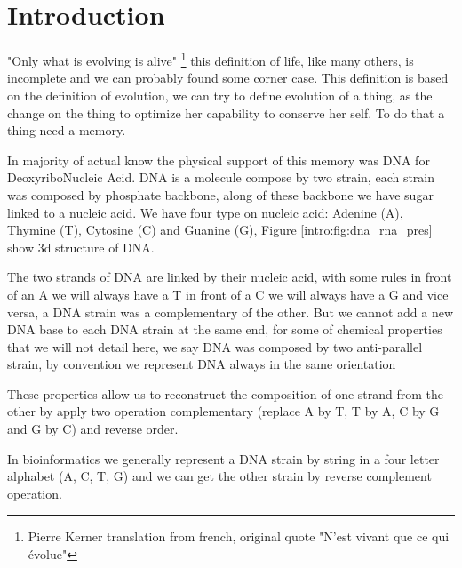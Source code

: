 \documentclass[./main.tex]{subfiles}
\begin{document}
\chapter{Introduction}\label{chapter:introduction}

"Only what is evolving is alive" \footnote{Pierre Kerner translation from french, original quote "N'est vivant que ce qui évolue"} this definition of life, like many others, is incomplete and we can probably found some corner case. This definition is based on the definition of evolution, we can try to define evolution of a thing, as the change on the thing to optimize her capability to conserve her self. To do that a thing need a memory.

In majority of actual know the physical support of this memory was DNA for DeoxyriboNucleic Acid. DNA is a molecule compose by two strain, each strain was composed by phosphate backbone, along of these backbone we have sugar linked to a nucleic acid. We have four type on nucleic acid: Adenine (A), Thymine (T), Cytosine (C) and Guanine (G), Figure \ref{intro:fig:dna_rna_pres} show 3d structure of DNA.

The two strands of DNA are linked by their nucleic acid, with some rules in front of an A we will always have a T in front of a C we will always have a G and vice versa, a DNA strain was a complementary of the other. But we cannot add a new DNA base to each DNA strain at the same end, for some of chemical properties that we will not detail here, we say DNA was composed by two anti-parallel strain, by convention we represent DNA always in the same orientation

These properties allow us to reconstruct the composition of one strand from the other by apply two operation complementary (replace A by T, T by A, C by G and G by C) and reverse order.

In bioinformatics we generally represent a DNA strain by string in a four letter alphabet (A, C, T, G) and we can get the other strain by reverse complement operation.
\end{document}

